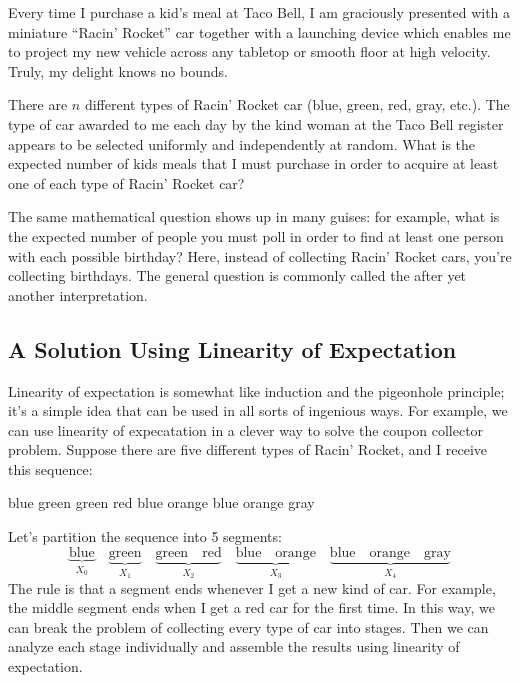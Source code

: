 \documentclass[12pt,twoside]{article}
\begin{document}
Every time I purchase a kid's meal at Taco Bell, I am graciously
presented with a miniature ``Racin' Rocket'' car together with a
launching device which enables me to project my new vehicle across any
tabletop or smooth floor at high velocity.  Truly, my delight knows no
bounds.

There are $n$ different types of Racin' Rocket car (blue, green, red,
gray, etc.).  The type of car awarded to me each day by the kind woman
at the Taco Bell register appears to be selected uniformly and
independently at random.  What is the expected number of kids meals
that I must purchase in order to acquire at least one of each type of
Racin' Rocket car?

The same mathematical question shows up in many guises: for example,
what is the expected number of people you must poll in order to find
at least one person with each possible birthday?  Here, instead of
collecting Racin' Rocket cars, you're collecting birthdays.  The
general question is commonly called the  after yet another interpretation.

\subsection{A Solution Using Linearity of Expectation}

Linearity of expectation is somewhat like induction and the pigeonhole
principle; it's a simple idea that can be used in all sorts of
ingenious ways.  For example, we can use linearity of expecatation in
a clever way to solve the coupon collector problem.  Suppose there are
five different types of Racin' Rocket, and I receive this sequence:
%
\begin{center}
blue \quad green \quad green \quad red \quad blue \quad orange \quad blue \quad orange \quad gray
\end{center}
%
Let's partition the sequence into 5 segments:
%
\[
\underbrace{\text{blue}}_{X_0} \quad
\underbrace{\text{green}}_{X_1} \quad
\underbrace{\text{green} \quad \text{red}}_{X_2} \quad
\underbrace{\text{blue} \quad \text{orange}}_{X_3} \quad
\underbrace{\text{blue} \quad \text{orange} \quad \text{gray}}_{X_4}
\]
%
The rule is that a segment ends whenever I get a new kind of car.  For
example, the middle segment ends when I get a red car for the first
time.  In this way, we can break the problem of collecting every type
of car into stages.  Then we can analyze each stage individually and
assemble the results using linearity of expectation.
\end{document}
